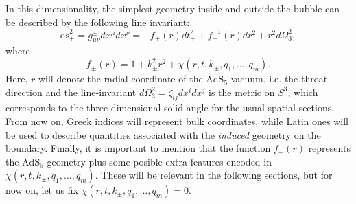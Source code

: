 In this dimensionality, the simplest geometry inside and outside the bubble can be described by the following line invariant:
\begin{equation}\label{eq: basic_global_bubble}
	\text{ds}_{\pm}^{2} = g^{\pm}_{\mu\nu} dx^{\mu} dx^{\nu} =  -f_{\pm}(r) dt_{\pm}^{2} + f^{-1}_{\pm}(r) dr^{2} + r^{2} d\Omega_{3}^{2},
\end{equation}
where
\begin{equation}\label{eq: vacuum_func}
	f_{\pm}(r) = 1 + k_{\pm}^{2} r^{2} + \chi(r, t, k_{\pm}, q_{1},..., q_{m}).
\end{equation}
Here, $r$ will denote the radial coordinate of the $\text{AdS}_{5}$ vacuum, i.e. the throat direction and the line-invariant $d\Omega_{3}^{2} = \zeta_{ij}dx^{i}dx^{j}$ is the metric on $S^{3}$, which corresponds to the three-dimensional solid angle for the usual spatial sections. From now on, Greek indices will represent bulk coordinates, while Latin ones will be used to describe quantities associated with the \textit{induced} geometry on the boundary. Finally, it is important to mention that the function $f_{\pm}(r)$ represents the $\text{AdS}_{5}$ geometry plus some posible extra features encoded in $\chi(r, t, k_{\pm}, q_{1},..., q_{m})$. These will be relevant in the following sections, but for now on, let us fix $\chi(r, t, k_{\pm}, q_{1},..., q_{m}) =0$.


